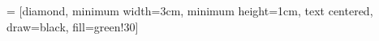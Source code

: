  = [diamond, minimum width=3cm, minimum height=1cm, text centered, draw=black, fill=green!30]


\begin{comment}

Arrows                      :   https://tikz.dev/tikz-arrows
Node alignment              :   https://tikz.net/contents/chapter-03-drawing-positioning-and-aligning-nodes/
Array/Matrix                :   https://tikz.dev/tikz-matrices
draw in table               :   baseline=0 to fit picture in table cell.
package for vectorgraphics  :   PGF, PGFPlots


positioning         :   https://rmwu.github.io/tutorial/latex/2019/11/21/positioning/

\begin{tikzpicture}[ baseline=0, node distance=1.5cm]

path                :   --  -|  |-
cordinate           :   ++(x, y)    ++(2,0)     ++(-2, 0)
Node                :   \node (lable) at (y,x)  [ params ] {text}
Node params         :   xshift=-1cm, yshift=0.2cm, below left=2cm, of=node, draw=blue!60
draw(line,arrow)    :   (node/cordinate)    path    (node/cordinate)

\draw [flowchart-arrow]  node1 path1 (node/cordinate) path2 (node/cordinate) path3 (node/cordinate)


arrow from bottom to up taking left turn : draw [flowchart-arrow] (bottomNode.west) -- +(-2,0) |- (topNode.west);
\draw (0,0) -- ++(1,0) -- ++(0,1) -- ++(-1,0) -- cycle;

\node (N1) [flowchart-start] {NodeText};
\node (N2) [flowchart-process, below of=N1] { NodeText };
\node (N2) [flowchart-process, below left=2cm of=N1] { NodeText };
intermediate node   :   node [right of= S3, xshift=-1cm, yshift=0.2cm] { NodeText }

\end{comment}
